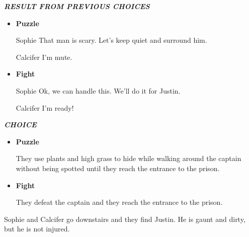\textit{\textbf{RESULT FROM PREVIOUS CHOICES}}
\begin{itemize}
  \item \textbf{Puzzle}
  
\begin{screenplay}

\begin{dialogue}{Sophie}
  That man is scary. Let's keep quiet and surround him.
\end{dialogue}

\begin{dialogue}{Calcifer}
  I'm mute.
\end{dialogue}
  
\end{screenplay}
\vspace{1em}
  
  \item \textbf{Fight}
  
\begin{screenplay}

\begin{dialogue}[determined]{Sophie}
  Ok, we can handle this. We'll do it for Justin.
\end{dialogue}
  
\begin{dialogue}[determined]{Calcifer}
  I'm ready!
\end{dialogue}

\end{screenplay}
\vspace{1em}
  
\end{itemize}

\textit{\textbf{CHOICE}}
\begin{itemize}
  \item \textbf{Puzzle}
  
  They use plants and high grass to hide while walking around the captain without being spotted until they reach the entrance to the prison.

  \item \textbf{Fight}

  They defeat the captain and they reach the entrance to the prison.
\end{itemize}


Sophie and Calcifer go downstairs and they find Justin. He is gaunt and dirty, but he is not injured.

